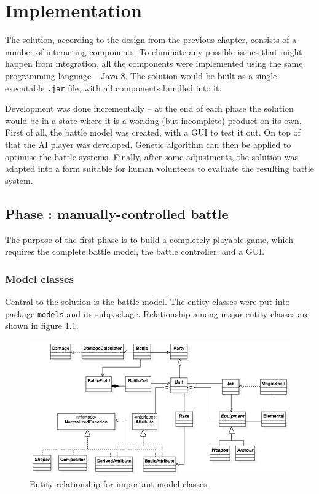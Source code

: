 \chapter{Implementation}

The solution, according to the design from the previous chapter, consists of a number of interacting components. To eliminate any possible issues that might happen from integration, all the components were implemented using the same programming language -- Java 8. The solution would be built as a single executable \texttt{.jar} file, with all components bundled into it.

Development was done incrementally -- at the end of each phase the solution would be in a state where it is a working (but incomplete) product on its own. First of all, the battle model was created, with a GUI to test it out. On top of that the AI player was developed. Genetic algorithm can then be applied to optimise the battle systems. Finally, after some adjustments, the solution was adapted into a form suitable for human volunteers to evaluate the resulting battle system.

\section{Phase : manually-controlled battle}

The purpose of the first phase is to build a completely playable game, which requires the complete battle model, the battle controller, and a GUI.

\subsection{Model classes}

Central to the solution is the battle model. The entity classes were put into package \texttt{models} and its subpackage. Relationship among major entity classes are shown in figure \ref{fig:uml_models}.

\begin{figure}
	\centering
	\includegraphics[width=1\linewidth]{figures/uml_models.png}
	\caption{Entity relationship for important model classes.}
	\label{fig:uml_models}
\end{figure}

